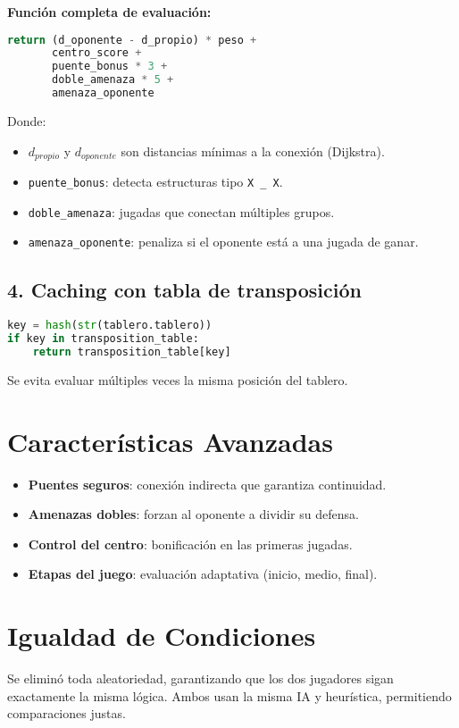 \documentclass[12pt]{article}
\begin{document}
\textbf{Función completa de evaluación:}
\begin{lstlisting}[language=Python]
return (d_oponente - d_propio) * peso + 
       centro_score +
       puente_bonus * 3 +
       doble_amenaza * 5 +
       amenaza_oponente
\end{lstlisting}

Donde:
\begin{itemize}
  \item $d_{propio}$ y $d_{oponente}$ son distancias mínimas a la conexión (Dijkstra).
  \item \texttt{puente\_bonus}: detecta estructuras tipo \texttt{X \_ X}.
  \item \texttt{doble\_amenaza}: jugadas que conectan múltiples grupos.
  \item \texttt{amenaza\_oponente}: penaliza si el oponente está a una jugada de ganar.
\end{itemize}

\subsection{4. Caching con tabla de transposición}

\begin{lstlisting}[language=Python]
key = hash(str(tablero.tablero))
if key in transposition_table:
    return transposition_table[key]
\end{lstlisting}

Se evita evaluar múltiples veces la misma posición del tablero.

\section{Características Avanzadas}
\begin{itemize}
  \item \textbf{Puentes seguros}: conexión indirecta que garantiza continuidad.
  \item \textbf{Amenazas dobles}: forzan al oponente a dividir su defensa.
  \item \textbf{Control del centro}: bonificación en las primeras jugadas.
  \item \textbf{Etapas del juego}: evaluación adaptativa (inicio, medio, final).
\end{itemize}

\section{Igualdad de Condiciones}
Se eliminó toda aleatoriedad, garantizando que los dos jugadores sigan exactamente la misma lógica. Ambos usan la misma IA y heurística, permitiendo comparaciones justas.
\end{document}
